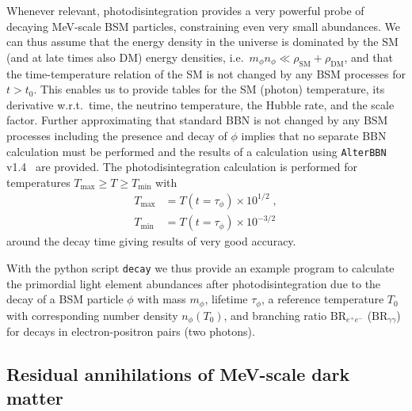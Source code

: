 \documentclass[11pt,a4paper]{article}
\newcommand{\eqsp}{\;}
\begin{document}
Whenever relevant, photodisintegration provides a very powerful probe of decaying MeV-scale BSM particles, constraining even very small abundances. We can thus assume that the energy density in the universe is dominated by the SM (and at late times also DM) energy densities, i.e.\ $m_\phi n_\phi \ll \rho_\mathrm{SM} + \rho_\mathrm{DM}$, and that the time-temperature relation of the SM is not changed by any BSM processes for $t > t_0$. This enables us to provide tables for the SM (photon) temperature, its derivative w.r.t.\ time, the neutrino temperature, the Hubble rate, and the scale factor.
Further approximating that standard BBN is not changed by any BSM processes including the presence and decay of $\phi$ implies that no separate BBN calculation must be performed and the results of a calculation using \texttt{AlterBBN} v1.4~\cite{Arbey:2011nf,Arbey:2018zfh} are provided.
The photodisintegration calculation is performed for temperatures $T_\mathrm{max} \geq T \geq T_\mathrm{min}$ with
\begin{align}
T_\mathrm{max} &= T(t = \tau_\phi) \times 10^{1/2} \eqsp, \\
T_\mathrm{min} &= T(t = \tau_\phi) \times 10^{-3/2}
\end{align}
around the decay time giving results of very good accuracy.

With the python script \texttt{decay} we thus provide an example program to calculate the primordial light element abundances after photodisintegration due to the decay of a BSM particle $\phi$ with mass $m_\phi$, lifetime $\tau_\phi$, a reference temperature $T_0$ with corresponding number density $n_\phi (T_0)$, and branching ratio $\text{BR}_{e^+ e^-}$ ($\text{BR}_{\gamma \gamma}$) for decays in electron-positron pairs (two photons).

\subsection{Residual annihilations of MeV-scale dark matter}
\label{sec:annihilation_model}
\end{document}
